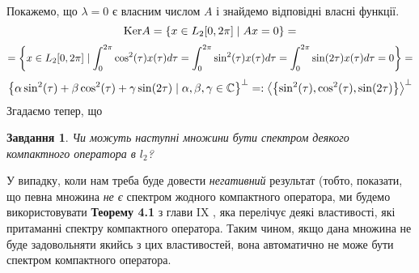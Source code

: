 \documentclass[12pt]{article} %
\newtheorem{prob}{Завдання}
\begin{document}
Покажемо, що $\lambda=0$ є власним числом $A$ і знайдемо відповідні власні функції. 
\[\mbox{Ker} A=\left\{x\in L_2[0,2\pi]\mid Ax=0\right\}=\]\[=\left\{x\in L_2[0,2\pi]\mid \int_0^{2\pi}\cos^2(\tau)x(\tau)d\tau=\int_0^{2\pi}\sin^2(\tau)x(\tau)d\tau=\int_0^{2\pi}\sin(2\tau)x(\tau)d\tau=0\right\}=\]
\[\left\{\alpha\sin^2(\tau)+\beta\cos^2(\tau)+\gamma\sin(2\tau)
\mid \alpha,\beta,\gamma\in\mathbb{C}\right\}^\perp=:\left<\left\{\sin^2(\tau),\cos^2(\tau),\sin(2\tau)\right\}\right>^\perp\]
Згадаємо тепер, що 
\begin{prob}Чи можуть наступні множини бути спектром деякого компактного оператора в $l_2$?\end{prob}
	У випадку, коли нам треба буде довести \textit{негативний} результат (тобто, показати, що певна множина \textit{не є}
	спектром жодного компактного оператора, ми будемо використовувати \textbf{Теорему 4.1} з глави IX
	\cite{tb}, яка перелічує деякі властивості, які
	притаманні спектру компактного оператора. Таким чином, якщо дана множина не буде задовольняти якийсь з цих властивостей, вона автоматично
	не може бути спектром компактного оператора.
\end{document}
